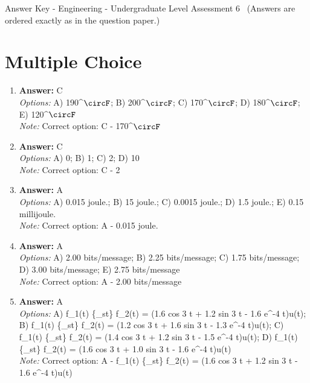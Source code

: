 \documentclass[12pt]{article}
\begin{document}
\begin{center}
Answer Key - Engineering - Undergraduate Level Assessment 6 \
\small (Answers are ordered exactly as in the question paper.)
\end{center}

\section*{Multiple Choice}
\begin{enumerate}[label=\arabic*.]
\item \textbf{Answer:} C
\\ \textit{Options:} A) 190^\ensuremath{\circF}; B) 200^\ensuremath{\circF}; C) 170^\ensuremath{\circF}; D) 180^\ensuremath{\circF}; E) 120^\ensuremath{\circF}
\\ \textit{Note:} Correct option: C - 170^\ensuremath{\circF}
\item \textbf{Answer:} C
\\ \textit{Options:} A) 0; B) 1; C) 2; D) 10
\\ \textit{Note:} Correct option: C - 2
\item \textbf{Answer:} A
\\ \textit{Options:} A) 0.015 joule.; B) 15 joule.; C) 0.0015 joule.; D) 1.5 joule.; E) 0.15 millijoule.
\\ \textit{Note:} Correct option: A - 0.015 joule.
\item \textbf{Answer:} A
\\ \textit{Options:} A) 2.00 bits/message; B) 2.25 bits/message; C) 1.75 bits/message; D) 3.00 bits/message; E) 2.75 bits/message
\\ \textit{Note:} Correct option: A - 2.00 bits/message
\item \textbf{Answer:} A
\\ \textit{Options:} A) f\_1(t) \{\_st\} f\_2(t) = (1.6 cos 3 t + 1.2 sin 3 t - 1.6 e^-4 t)u(t); B) f\_1(t) \{\_st\} f\_2(t) = (1.2 cos 3 t + 1.6 sin 3 t - 1.3 e^-4 t)u(t); C) f\_1(t) \{\_st\} f\_2(t) = (1.4 cos 3 t + 1.2 sin 3 t - 1.5 e^-4 t)u(t); D) f\_1(t) \{\_st\} f\_2(t) = (1.6 cos 3 t + 1.0 sin 3 t - 1.6 e^-4 t)u(t)
\\ \textit{Note:} Correct option: A - f\_1(t) \{\_st\} f\_2(t) = (1.6 cos 3 t + 1.2 sin 3 t - 1.6 e^-4 t)u(t)
\end{enumerate}
\end{document}
